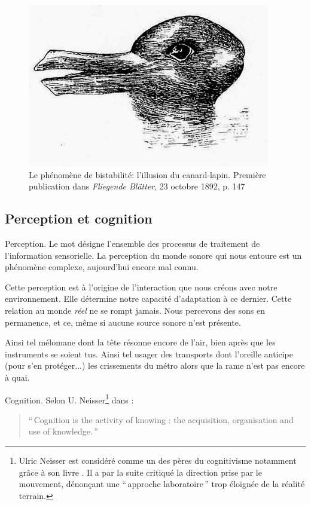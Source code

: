 {\begin{figure}[t]
        \myfloatalign
        \includegraphics[width=.6\linewidth]{gfx/ch_3/canard_lapin}
        \caption[Le phénomène de bistabilité: l'illusion du canard-lapin]{Le phénomène de bistabilité: l'illusion du canard-lapin. Première publication dans \emph{Fliegende Blätter}, 23 octobre 1892, p. 147}\label{fig:bistabilite}
\end{figure}

\subsection{Perception et cognition}
\label{sec:ch3_perceptionCognition}

Perception. Le mot désigne l'ensemble des processus de traitement de l'information sensorielle. La perception du monde sonore qui nous entoure est un phénomène complexe, aujourd'hui encore mal connu. 

Cette perception est à l'origine de l'interaction que nous créons avec notre environnement. Elle détermine notre capacité d'adaptation à ce dernier. Cette relation au monde \emph{réel} ne se rompt jamais. Nous percevons des sons en permanence, et ce, même si aucune source sonore n'est présente. 

Ainsi tel mélomane dont la tête résonne encore de l'air, bien après que les instruments se soient tus. Ainsi tel usager des transports dont l'oreille anticipe (pour s'en protéger...) les crissements du métro alors que la rame n'est pas encore à quai.

Cognition. Selon U. Neisser\footnote{Ulric Neisser est considéré comme un des pères du cognitivisme notamment grâce à son livre \citep{neisser1967cognitive}. Il a par la suite critiqué la direction prise par le mouvement, dénonçant une ``\,approche laboratoire\,'' trop éloignée de la réalité terrain.} dans \citep[p. ??]{neisser1976cognition}:

\begin{quote}
``\,Cognition is the activity of knowing : the acquisition, organisation and use of knowledge.\,''
\end{quote}

}
